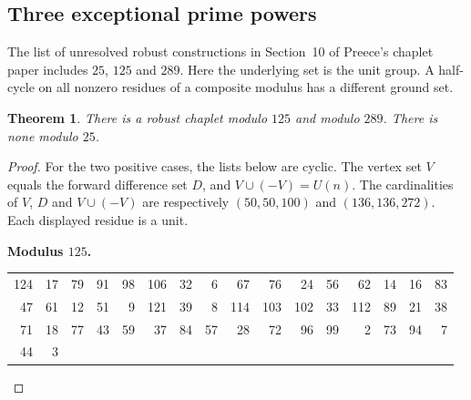 \documentclass[11pt,a4paper]{article}
\newtheorem{theorem}{Theorem}[section]
\newcommand{\U}{U}
\begin{document}
\subsection{Three exceptional prime powers}
The list of unresolved robust constructions in Section~10 of Preece's chaplet paper includes $25$, $125$ and $289$. Here the underlying set is the unit group. A half-cycle on all nonzero residues of a composite modulus has a different ground set.

\begin{theorem}\label{thm:robust-three-powers}
There is a robust chaplet modulo $125$ and modulo $289$. There is none modulo $25$.
\end{theorem}

\begin{proof}
For the two positive cases, the lists below are cyclic. The vertex set $V$ equals the forward difference set $D$, and $V\cup(-V)=\U(n)$. The cardinalities of $V$, $D$ and $V\cup(-V)$ are respectively $(50,50,100)$ and $(136,136,272)$. Each displayed residue is a unit.

\par\noindent\begin{minipage}{\linewidth}
\noindent\textbf{Modulus $125$.}\par\smallskip
{\small\centering\setlength{\tabcolsep}{3pt}
\begin{tabular}{*{16}{r}}
124 & 17 & 79 & 91 & 98 & 106 & 32 & 6 & 67 & 76 & 24 & 56 & 62 & 14 & 16 & 83 \\
47 & 61 & 12 & 51 & 9 & 121 & 39 & 8 & 114 & 103 & 102 & 33 & 112 & 89 & 21 & 38 \\
71 & 18 & 77 & 43 & 59 & 37 & 84 & 57 & 28 & 72 & 96 & 99 & 2 & 73 & 94 & 7 \\
44 & 3 \\
\end{tabular}\par}
\end{minipage}\par


\end{proof}
\end{document}
